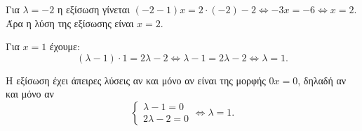 
\begin{alist}
\item 
\begin{rlist}
\item Για $\lambda = -2$ η εξίσωση γίνεται $(-2 - 1)x = 2 \cdot (-2) - 2 \Leftrightarrow -3x = -6 \Leftrightarrow x = 2$.
Άρα η λύση της εξίσωσης είναι $x = 2$.

\item Για $x = 1$ έχουμε:
\[(\lambda - 1) \cdot 1 = 2\lambda - 2 \Leftrightarrow \lambda - 1 = 2\lambda - 2 \Leftrightarrow \lambda = 1.\]
\end{rlist}

\item Η εξίσωση έχει άπειρες λύσεις αν και μόνο αν είναι της μορφής $0x = 0$, δηλαδή αν και μόνο αν 
\[\begin{cases} \lambda - 1 = 0 \\ 2\lambda - 2 = 0 \end{cases} \Leftrightarrow \lambda = 1.\]
\end{alist}

